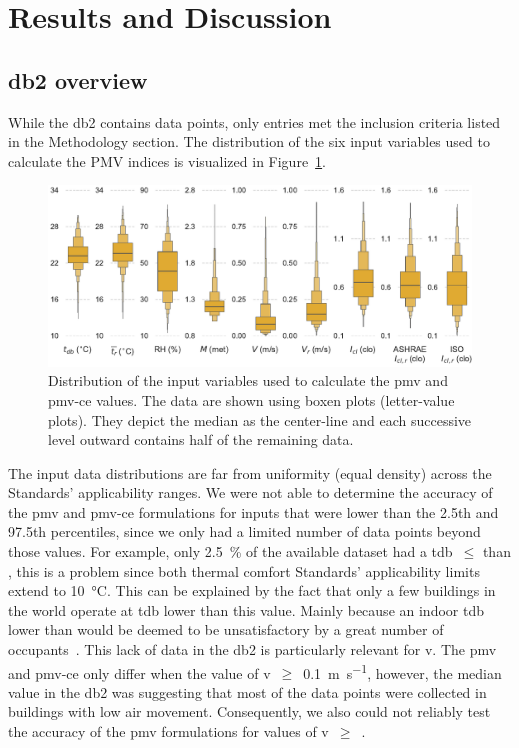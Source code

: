 \section{Results and Discussion}\label{sec:results}

\subsection{\ac{db2} overview}\label{subsec:comfort-db-overview}
While the \ac{db2} contains  data points, only  entries met the inclusion criteria listed in the Methodology section.
The distribution of the six input variables used to calculate the PMV indices is visualized in Figure~\ref{fig:dist_input_data}.
\begin{figure}[htb!]
    \centering
    \includegraphics[width=\textwidth]{figures/dist_input_data}
    \caption{Distribution of the input variables used to calculate the \ac{pmv} and \ac{pmv-ce} values.
    The data are shown using boxen plots (letter-value plots).
    They depict the median as the center-line and each successive level outward contains half of the remaining data.}
    \label{fig:dist_input_data}
\end{figure}
The input data distributions are far from uniformity (equal density) across the Standards' applicability ranges.
We were not able to determine the accuracy of the \ac{pmv} and \ac{pmv-ce} formulations for inputs that were lower than the 2.5th and 97.5th percentiles, since we only had a limited number of data points beyond those values.
For example, only \qty{2.5}{\percent} of the available dataset had a \ac{tdb}~$\leq$ than , this is a problem since both thermal comfort Standards' applicability limits extend to \qty{10}{\celsius}.
This can be explained by the fact that only a few buildings in the world operate at \ac{tdb} lower than this value.
Mainly because an indoor \ac{tdb} lower than  would be deemed to be unsatisfactory by a great number of occupants~\cite{iso7730}.
This lack of data in the \ac{db2} is particularly relevant for \ac{v}.
The \ac{pmv} and \ac{pmv-ce} only differ when the value of \ac{v}~$\geq$~\qty{0.1}{\m\per\s}, however, the median value in the \ac{db2} was  suggesting that most of the data points were collected in buildings with low air movement.
Consequently, we also could not reliably test the accuracy of the \ac{pmv} formulations for values of \ac{v}~$\geq$~.

